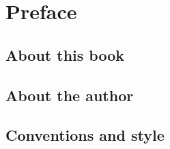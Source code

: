 \chapter{Preface}

\section{About this book}

\section{About the author}

\section{Conventions and style}